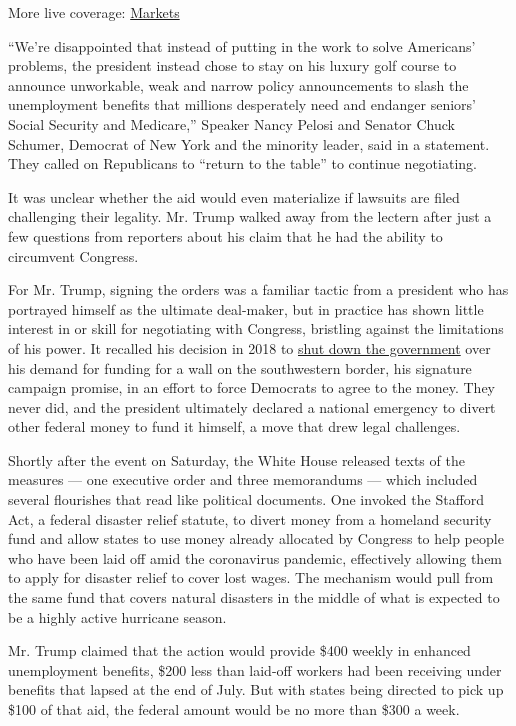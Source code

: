More live coverage:
\href{https://www.nytimes.com/live/2020/08/07/business/stock-market-today-coronavirus?action=click\&pgtype=Article\&state=default\&region=MAIN_CONTENT_1\&context=storylines_live_updates}{Markets}

``We're disappointed that instead of putting in the work to solve
Americans' problems, the president instead chose to stay on his luxury
golf course to announce unworkable, weak and narrow policy announcements
to slash the unemployment benefits that millions desperately need and
endanger seniors' Social Security and Medicare,'' Speaker Nancy Pelosi
and Senator Chuck Schumer, Democrat of New York and the minority leader,
said in a statement. They called on Republicans to ``return to the
table'' to continue negotiating.

It was unclear whether the aid would even materialize if lawsuits are
filed challenging their legality. Mr. Trump walked away from the lectern
after just a few questions from reporters about his claim that he had
the ability to circumvent Congress.

For Mr. Trump, signing the orders was a familiar tactic from a president
who has portrayed himself as the ultimate deal-maker, but in practice
has shown little interest in or skill for negotiating with Congress,
bristling against the limitations of his power. It recalled his decision
in 2018 to
\href{https://www.nytimes.com/2018/12/21/us/politics/trump-shutdown-border-wall.html}{shut
down the government} over his demand for funding for a wall on the
southwestern border, his signature campaign promise, in an effort to
force Democrats to agree to the money. They never did, and the president
ultimately declared a national emergency to divert other federal money
to fund it himself, a move that drew legal challenges.

Shortly after the event on Saturday, the White House released texts of
the measures --- one executive order and three memorandums --- which
included several flourishes that read like political documents. One
invoked the Stafford Act, a federal disaster relief statute, to divert
money from a homeland security fund and allow states to use money
already allocated by Congress to help people who have been laid off amid
the coronavirus pandemic, effectively allowing them to apply for
disaster relief to cover lost wages. The mechanism would pull from the
same fund that covers natural disasters in the middle of what is
expected to be a highly active hurricane season.

Mr. Trump claimed that the action would provide \$400 weekly in enhanced
unemployment benefits, \$200 less than laid-off workers had been
receiving under benefits that lapsed at the end of July. But with states
being directed to pick up \$100 of that aid, the federal amount would be
no more than \$300 a week.

